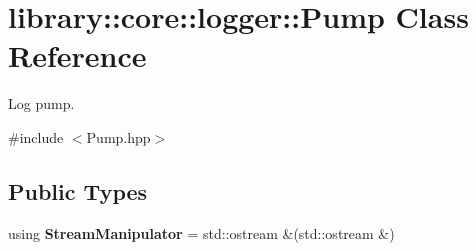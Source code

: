 \hypertarget{classlibrary_1_1core_1_1logger_1_1_pump}{}\section{library\+:\+:core\+:\+:logger\+:\+:Pump Class Reference}
\label{classlibrary_1_1core_1_1logger_1_1_pump}


Log pump.  




{\ttfamily \#include $<$Pump.\+hpp$>$}

\subsection*{Public Types}
\begin{DoxyCompactItemize}
\item 
\mbox{\label{classlibrary_1_1core_1_1logger_1_1_pump_ab8990ff21e57c39977af471ddeb57637}} 
using {\bfseries Stream\+Manipulator} = std\+::ostream \&(std\+::ostream \&)
\end{DoxyCompactItemize}
